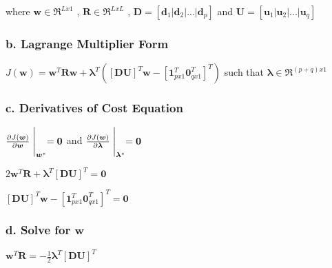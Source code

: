 \documentclass[paper=a4, fontsize=11pt]{scrartcl} %
\numberwithin{equation}{section} %
\numberwithin{figure}{section} %
\numberwithin{table}{section} %
\begin{document}
\vspace{4mm}

where\hspace{5pt}
\(
\bm{w} \in \mathfrak{R}^{Lx1}
\)
,\hspace{5pt}
\(
\bm{R} \in \mathfrak{R}^{LxL}
\)
,\hspace{5pt}
\(
\bm{D} = \left[\bm{d}_1 | \bm{d}_2 | ... | \bm{d}_p\right]
\)
\hspace{5pt}
and
\hspace{5pt}
\(
\bm{U} = \left[\bm{u}_1 | \bm{u}_2 | ... | \bm{u}_q\right]
\)

\subsubsection*{b. Lagrange Multiplier Form}

\(
J(\bm{w}) = 
\bm{w}^T\bm{R}\bm{w} + 
\bm{\lambda}^T
\left(\left[\bm{D}\bm{U}\right]^T\bm{w} - \left[\bm{1}_{px1}^T \bm{0}_{qx1}^T\right]^T\right)
\)
\hspace{5pt} such that \hspace{5pt}
\(
\bm{\lambda} \in \mathfrak{R}^{(p+q)x1}
\)

\subsubsection*{c. Derivatives of Cost Equation}
\(
\frac{\partial J(\bm{w})}{\partial \bm{w}}\Biggm\lvert_{\bm{w}^*}  = \bm{0}
\)
\hspace{5pt}and\hspace{5pt}
\(
\frac{\partial J(\bm{w})}{\partial \bm{\lambda}}\Biggm\lvert_{\bm{\lambda}^*}  = \bm{0}
\)

\vspace{2mm}

\(
2 \bm{w}^T\bm{R} + \bm{\lambda}^T\left[\bm{D}\bm{U}\right]^T = \bm{0}
\)

\vspace{2mm}

\(
\left[\bm{D}\bm{U}\right]^T\bm{w} - \left[\bm{1}_{px1}^T \bm{0}_{qx1}^T\right]^T = \bm{0}
\)

\subsubsection*{d. Solve for \(\bm{w}\)}

\(
\bm{w}^T\bm{R} = -\frac{1}{2}\bm{\lambda}^T\left[\bm{D}\bm{U}\right]^T
\)

\vspace{2mm}
\end{document}
